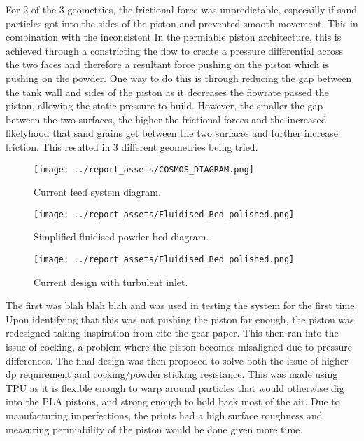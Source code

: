 For 2 of the 3 geometries, the frictional force was unpredictable, especailly if sand particles got into the sides of the piston and prevented smooth movement. This in combination with the inconsistent 
In the permiable piston architecture, this is achieved through a constricting the flow to create a pressure differential across the two faces and therefore a resultant force pushing on the piston which is pushing on the powder. One way to do this is through reducing the gap between the tank wall and sides of the piston as it decreases the flowrate passed the piston, allowing the static pressure to build. However, the smaller the gap between the two surfaces, the higher the frictional forces and the increased likelyhood that sand grains get between the two surfaces and further increase friction. This resulted in 3 different geometries being tried.
\begin{figure}[htbp]
    \centering

    \begin{minipage}{0.3\textwidth}
        \centering
        \texttt{[image: ../report\_assets/COSMOS\_DIAGRAM.png]}
        \caption{Current feed system diagram.}\label{fig:piston_geom_1}
    \end{minipage}
    \hfill
    \begin{minipage}{0.3\textwidth}
        \centering
        \texttt{[image: ../report\_assets/Fluidised\_Bed\_polished.png]}
        \caption{Simplified fluidised powder bed diagram.}\label{fig:piston_geom_2}
    \end{minipage}
    \hfill
    \begin{minipage}{0.3\textwidth}
        \centering
        \texttt{[image: ../report\_assets/Fluidised\_Bed\_polished.png]}
        \caption{Current design with turbulent inlet.}\label{fig:piston_geom_3}
    \end{minipage}

\end{figure}

The first was blah blah blah and was used in testing the system for the first time.
Upon identifying that this was not pushing the piston far enough, the piston was redesigned taking inspiration from cite the gear paper.
This then ran into the issue of cocking, a problem where the piston becomes misaligned due to pressure differences.
The final design was then proposed to solve both the issue of higher dp requirement and cocking/powder sticking resistance. This was made using TPU as it is flexible enough to warp around particles that would otherwise dig into the PLA pistons, and strong enough to hold back most of the air. Due to manufacturing imperfections, the prints had a high surface roughness and measuring permiability of the piston would be done given more time.
 
